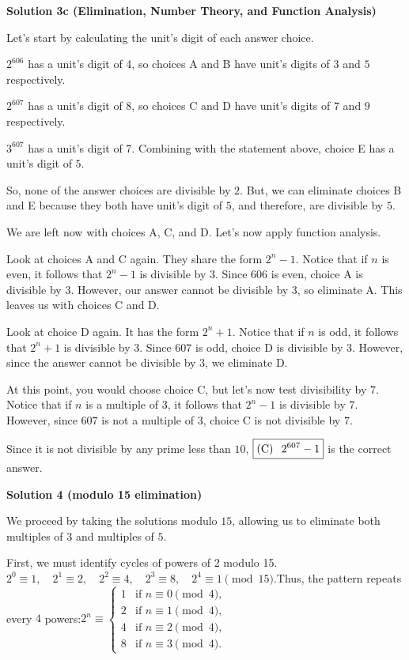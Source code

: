 \begin{enumerate}
\textbf{Solution 3c (Elimination, Number Theory, and Function Analysis)}

Let’s start by calculating the unit’s digit of each answer choice.

 $2^{606}$ has a unit’s digit of 4, so choices A and B have unit’s digits of $3$ and $5$ respectively.

 $2^{607}$ has a unit’s digit of 8, so choices C and D have unit’s digits of $7$ and $9$ respectively.

 $3^{607}$ has a unit’s digit of 7. Combining with the statement above, choice E has a unit’s digit of $5$.

 So, none of the answer choices are divisible by $2$. But, we can eliminate choices B and E because they both have unit’s digit of $5$, and therefore, are divisible by $5$.

 We are left now with choices A, C, and D. Let’s now apply function analysis.

 Look at choices A and C again. They share the form $2^{n}-1$. Notice that if $n$ is even, it follows that $2^{n}-1$ is divisible by $3$. Since $606$ is even, choice A is divisible by $3$. However, our answer cannot be divisible by $3$, so eliminate A. This leaves us with choices C and D.

 Look at choice D again. It has the form $2^{n}+1$. Notice that if $n$ is odd, it follows that $2^{n}+1$ is divisible by 3. Since $607$ is odd, choice D is divisible by $3$. However, since the answer cannot be divisible by $3$, we eliminate D.

 At this point, you would choose choice C, but let’s now test divisibility by $7$. Notice that if $n$ is a multiple of 3, it follows that $2^{n}-1$ is divisible by $7$. However, since $607$ is not a multiple of $3$, choice C is not divisible by $7$.

 Since it is not divisible by any prime less than $10$, $\boxed{(\text{C}) \hspace{0.1in} 2^{607}-1}$ is the correct answer.

 



\textbf{Solution 4 (modulo 15 elimination)}

We proceed by taking the solutions modulo $15$, allowing us to eliminate both multiples of $3$ and multiples of $5$.

 First, we must identify cycles of powers of 2 modulo 15.$2^0 \equiv 1, \quad 2^1 \equiv 2, \quad 2^2 \equiv 4, \quad 2^3 \equiv 8, \quad 2^4 \equiv 1 \pmod{15}.$Thus, the pattern repeats every $4$ powers:$2^n \equiv \begin{cases} 1 &\text{if } n \equiv 0 \pmod{4},\\ 2 &\text{if } n \equiv 1 \pmod{4},\\ 4 &\text{if } n \equiv 2 \pmod{4},\\ 8 &\text{if } n \equiv 3 \pmod{4}. \end{cases}$


\end{enumerate}
